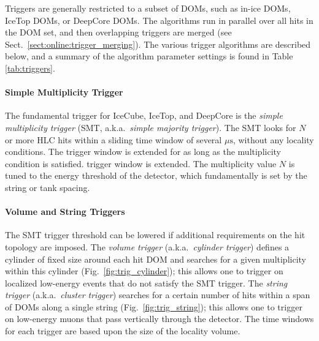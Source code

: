 Triggers are generally restricted to a subset of DOMs, such as in-ice DOMs,
IceTop DOMs, or DeepCore DOMs.  The algorithms run in parallel over all
hits in the DOM set, and then overlapping triggers are merged (see
Sect.~\ref{sect:online:trigger_merging}).   The various trigger algorithms
are described below, and a summary of the algorithm parameter settings is
found in Table \ref{tab:triggers}.  

\paragraph{Simple Multiplicity Trigger}

The fundamental trigger for IceCube, IceTop, and DeepCore is the \emph{simple
multiplicity trigger} (SMT, a.k.a.~\emph{simple majority trigger}).  The
SMT looks for $N$ or more HLC hits within a sliding time window of several
$\mu\mathrm{s}$, without any locality conditions.  The trigger window is
extended for as long as the multiplicity condition is satisfied.
trigger window is extended.  The multiplicity value $N$ is tuned to the
energy threshold of the detector, which fundamentally is set by the string
or tank spacing. 

\paragraph{Volume and String Triggers}

The SMT trigger threshold can be lowered if additional requirements on the
hit topology are imposed.  The \emph{volume trigger} (a.k.a.~\emph{cylinder
  trigger}) defines a cylinder of fixed size around each hit DOM and
searches for a given multiplicity within this cylinder
(Fig.~\ref{fig:trig_cylinder}); this allows one to trigger on localized
low-energy events that do not satisfy the SMT trigger. 
The \emph{string trigger} (a.k.a.~\emph{cluster trigger}) searches for a
certain number of hits within a span of DOMs along a single
string (Fig.~\ref{fig:trig_string}); this allows one to trigger on
low-energy muons that pass vertically 
through the detector.  The time windows for each trigger are based upon the
size of the locality volume.


